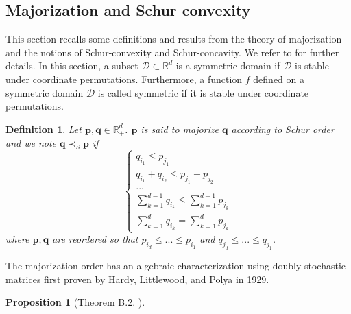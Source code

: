\documentclass[twoside,11pt]{book}
\newtheorem{proposition}{Proposition}
\newtheorem{definition}{Definition}
\numberwithin{theorem}{chapter}
\numberwithin{definition}{chapter}
\numberwithin{proposition}{chapter}
\numberwithin{corollary}{chapter}
\numberwithin{example}{chapter}
\numberwithin{lemma}{chapter}
\numberwithin{assumption}{chapter}
\numberwithin{equation}{chapter}
\numberwithin{figure}{chapter}
\begin{document}
\begin{subappendices}
\section{Majorization and Schur convexity}
\label{app:majorization}


This section recalls some definitions and results from the theory of majorization and the notions of Schur-convexity and Schur-concavity. We refer to \citep{MaOlAr11} for further details. In this section, a subset $\mathcal{D} \subset \mathbb{R}^{d}$ is a symmetric domain if $\mathcal{D}$ is stable under coordinate permutations. Furthermore, a function $f$ defined on a symmetric domain $\mathcal{D}$ is called symmetric if it is stable under coordinate permutations.

\begin{definition}\label{def:majorization}
Let $\bm{p},\bm{q} \in \mathbb{R}_{+}^{d}$. $\bm{p}$ is said to majorize $\bm{q}$ according to Schur order and we note $\bm{q} \prec_{S} \bm{p}$ if
\begin{equation}
\left\{
    \begin{array}{ll}
        q_{i_{1}} \leq p_{j_{1}} \\
        q_{i_{1}} + q_{i_{2}} \leq p_{j_{1}} + p_{j_{2}} \\
        ... \\
        \sum\limits_{k=1}^{d-1} q_{i_{k}} \leq \sum\limits_{k=1}^{d-1} p_{j_{k}}\\
        \sum\limits_{k=1}^{d} q_{i_{k}} = \sum\limits_{k=1}^{d} p_{j_{k}}
    \end{array}
\right.
\end{equation}
where $\bm{p},\bm{q}$ are reordered so that $p_{i_{d}} \leq ... \leq p_{i_{1}}$ and $q_{j_{d}} \leq ... \leq q_{j_{1}}$.
\end{definition}
The majorization order has an algebraic characterization using doubly stochastic matrices first proven by Hardy, Littlewood, and Polya in 1929.
\begin{proposition}[Theorem B.2. \citealp{MaOlAr11}]

\end{proposition}
\end{subappendices}
\end{document}

